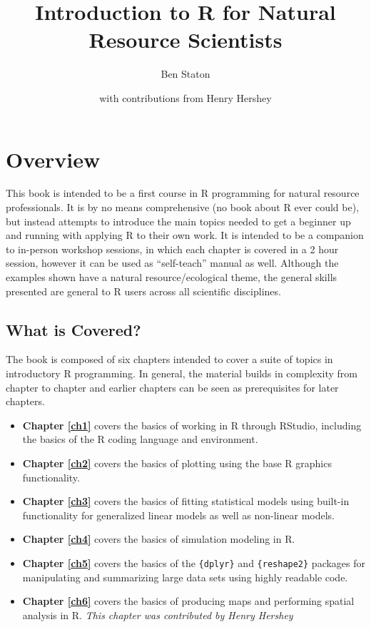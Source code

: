 \documentclass[]{book}
\title{Introduction to R for Natural Resource Scientists}
\author{Ben Staton}
\date{with contributions from Henry Hershey}
\providecommand{\tightlist}{%
  \setlength{\itemsep}{0pt}\setlength{\parskip}{0pt}}
\theoremstyle{definition}
\theoremstyle{definition}
\theoremstyle{definition}
\theoremstyle{remark}
\begin{document}
\maketitle

{
\hypersetup{linkcolor=black}
\setcounter{tocdepth}{1}
\tableofcontents
}
\chapter*{Overview}\label{overview}

This book is intended to be a first course in R programming for natural
resource professionals. It is by no means comprehensive (no book about R
ever could be), but instead attempts to introduce the main topics needed
to get a beginner up and running with applying R to their own work. It
is intended to be a companion to in-person workshop sessions, in which
each chapter is covered in a 2 hour session, however it can be used as
``self-teach'' manual as well. Although the examples shown have a
natural resource/ecological theme, the general skills presented are
general to R users across all scientific disciplines.

\section*{What is Covered?}\label{what-is-covered}

The book is composed of six chapters intended to cover a suite of topics
in introductory R programming. In general, the material builds in
complexity from chapter to chapter and earlier chapters can be seen as
prerequisites for later chapters.

\begin{itemize}
\tightlist
\item
  \textbf{Chapter \ref{ch1}} covers the basics of working in R through
  RStudio, including the basics of the R coding language and
  environment.
\item
  \textbf{Chapter \ref{ch2}} covers the basics of plotting using the
  base R graphics functionality.
\item
  \textbf{Chapter \ref{ch3}} covers the basics of fitting statistical
  models using built-in functionality for generalized linear models as
  well as non-linear models.\\
\item
  \textbf{Chapter \ref{ch4}} covers the basics of simulation modeling in
  R.
\item
  \textbf{Chapter \ref{ch5}} covers the basics of the \texttt{\{dplyr\}}
  and \texttt{\{reshape2\}} packages for manipulating and summarizing
  large data sets using highly readable code.
\item
  \textbf{Chapter \ref{ch6}} covers the basics of producing maps and
  performing spatial analysis in R. \emph{This chapter was contributed
  by Henry Hershey}
\end{itemize}
\end{document}
